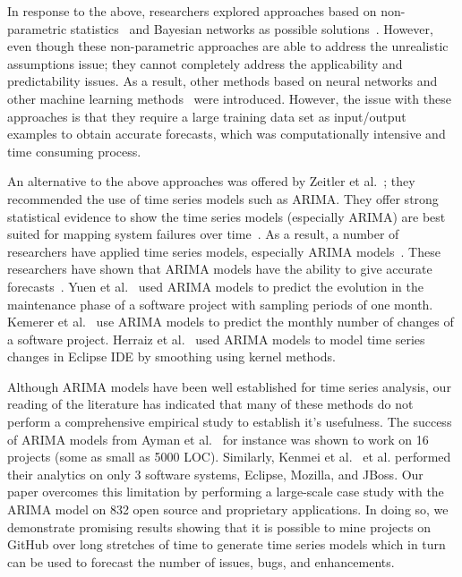 \documentclass[sigconf, preprint]{acmart}
\begin{document}
In response to the above, researchers explored approaches based on 
non-parametric statistics~\cite{Robinson87, Barghout98} and Bayesian networks as possible solutions~\cite{Neil96, Bai05, Fenton08, 
Wiper12}. 
However, even though these non-parametric
approaches are able to address the unrealistic assumptions issue;
they cannot completely address the applicability and predictability
issues. As a result, other methods based on neural networks and other
machine learning methods~\cite{karunanithi92, Pai06, Kiran07, Zaidi08, Lo09, 
Yang10, Moura11} were introduced. However, the issue with these approaches is that they 
require a large training data set as input/output examples to obtain 
accurate forecasts, which was computationally intensive and time consuming 
process. 

An  alternative to the above approaches was offered by Zeitler et 
al.~\cite{Zeitler91}; they recommended the use of time series models such as 
ARIMA. They offer strong statistical evidence to show the time series models 
(especially ARIMA) are best suited for mapping system failures over 
time~\cite{Zeitler91}. As a result, a number of researchers have applied time 
series models, especially ARIMA models~\cite{Singpur85, Chatterjee97, Xie99, 
Junhong05, amin2013approach}. These researchers have shown that ARIMA models 
have  the ability to give accurate forecasts~\cite{amin2013approach}. Yuen et 
al.~\cite{chong1988analyzing} used ARIMA models to predict the evolution in the 
maintenance phase 
of a software project with sampling
periods of one month. Kemerer et al.~\cite{kemerer1999empirical} use ARIMA 
models
to predict the monthly number of changes of a software
project. Herraiz et al.~\cite{herraiz2007forecasting} used ARIMA models to 
model time series changes in Eclipse IDE by smoothing using kernel methods. 

Although ARIMA models have been well established for time series analysis, our reading of the literature has indicated that many of these methods do not perform a comprehensive empirical study to establish it's usefulness. The 
success of ARIMA models from Ayman et al.~\cite{amin2013approach} for instance 
was 
shown to work on 16 projects (some as small as 5000 LOC). Similarly, Kenmei et al.~\cite{kenmei2008trend} et al. performed their analytics on only 3 software systems, Eclipse, Mozilla, and JBoss.  Our paper overcomes this limitation 
by performing a large-scale case study with the ARIMA model on 832 open source 
and 
proprietary applications. In doing so, we demonstrate promising results showing that it is possible to mine projects on GitHub over long stretches of time to generate 
time series models which in turn can be used to forecast the number 
of issues, bugs, and enhancements.
\end{document}
